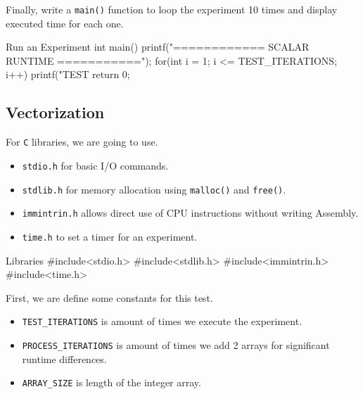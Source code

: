 \documentclass[12pt, a4paper]{article}
\begin{document}
            Finally, write a \texttt{main()} function to loop the experiment 10 times and display executed time for each one.
            \begin{codeblock}[minted language=c]{Run an Experiment}
                int main() {
                    printf("============ SCALAR RUNTIME ===========\n");
                    for(int i = 1; i <= TEST_ITERATIONS; i++) {
                        printf("TEST %
                    }
                    return 0;
                }
            \end{codeblock}

    \pagebreak

        \subsection{Vectorization}
            For \texttt{C} libraries, we are going to use.
            \begin{itemize}
                \item \texttt{stdio.h} for basic I/O commands.
                \item \texttt{stdlib.h} for memory allocation using \texttt{malloc()} and \texttt{free()}.
                \item \texttt{immintrin.h} allows direct use of CPU instructions without writing Assembly.
                \item \texttt{time.h} to set a timer for an experiment.
            \end{itemize}

            \begin{codeblock}[minted language=c]{Libraries}
                #include<stdio.h>
                #include<stdlib.h>
                #include<immintrin.h>
                #include<time.h>
            \end{codeblock}

            First, we are define some constants for this test.
            \begin{itemize}
                \item \texttt{TEST\_ITERATIONS} is amount of times we execute the experiment.
                \item \texttt{PROCESS\_ITERATIONS} is amount of times we add 2 arrays for significant runtime differences.
                \item \texttt{ARRAY\_SIZE} is length of the integer array.
            \end{itemize}
\end{document}
